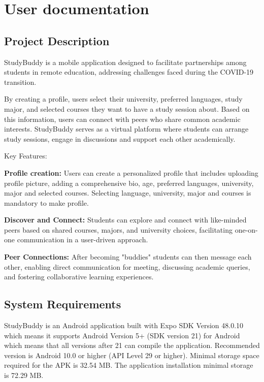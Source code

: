 \chapter{User documentation}
\label{ch:user}

\section{Project Description}
StudyBuddy is a mobile application designed to facilitate partnerships among students in remote education, addressing challenges faced during the COVID-19 transition.

By creating a profile, users select their university, preferred languages, study major, and selected courses they want to have a study session about. Based on this information, users can connect with peers who share common academic interests. StudyBuddy serves as a virtual platform where students can arrange study sessions, engage in discussions and support each other academically.

Key Features:
\begin{compactitem}
    \item \textbf{Profile creation:} Users can create a personalized profile that includes uploading profile picture, adding a comprehensive bio, age, preferred languages, university, major and selected courses. Selecting language, university, major and courses is mandatory to make profile.
    \item \textbf{Discover and Connect:} Students can explore and connect with like-minded peers based on shared courses, majors, and university choices, facilitating one-on-one communication in a user-driven approach.
    \item \textbf{Peer Connections:} After becoming "buddies" students can then message each other, enabling direct communication for meeting, discussing academic queries, and fostering collaborative learning experiences. 
\end{compactitem}
\section{System Requirements}\label{sec:system_requirements}
StudyBuddy is an Android application built with Expo SDK Version 48.0.10 which means it supports Android Version 5+ (SDK version 21) for Android which means that all versions after 21 can compile the application. Recommended version is Android 10.0 or higher (API Level 29 or higher). Minimal storage space required for the APK is 32.54 MB. The application installation minimal storage is 72.29 MB.
